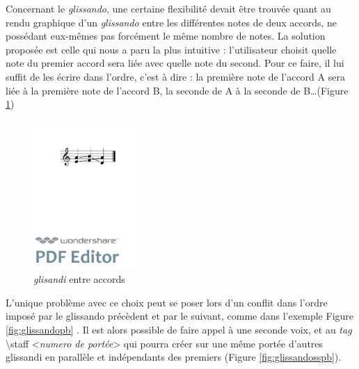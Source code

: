 \documentclass{article}
\newenvironment{gmncode}	{\vspace{-2mm}\small\verbatim}{\endverbatim\vspace{-2mm}}
\begin{document}
Concernant le \emph{glissando}, une certaine flexibilité devait être trouvée quant au rendu graphique d'un \emph{glissando} entre les différentes notes de deux accords, ne possédant eux-mêmes pas forcément le même nombre de notes. La solution proposée est celle qui nous a paru la plus intuitive : l'utilisateur choisit quelle note du premier accord sera liée avec quelle note du second. Pour ce faire, il lui suffit de les écrire dans l'ordre, c'est à dire : la première note de l'accord A sera liée à la première note de l'accord B, la seconde de A à la seconde de B\dots{}(Figure \ref{fig:glissandosimple})

\begin{figure}[h]
\begin{center}
\begin{gmncode}
[\glissando({e,a} {f,b} {a,d})]
\end{gmncode}
\bigskip

\includegraphics[width=4cm]{img/glissandosimple.pdf}
\caption{\emph{glisandi} entre accords}
\label{fig:glissandosimple}
\end{center}
\end{figure}

L'unique problème avec ce choix peut se poser lors d'un conflit dans l'ordre imposé par le glissando précèdent et par le suivant, comme dans l'exemple Figure \ref{fig:glissandopb} . Il est alors possible de faire appel à une seconde voix, et au \emph{tag} \textbackslash{}staff \textless{}\textit{numero de portée}\textgreater{} qui pourra créer sur une même portée d'autres glissandi en parallèle et indépendants des premiers (Figure \ref{fig:glissandosspb}).
\end{document}

